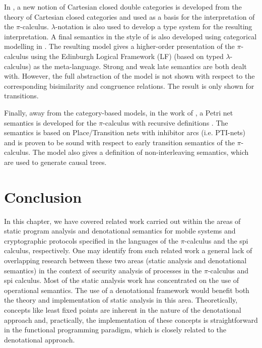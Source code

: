 \documentclass[10pt,a4paper,final,oneside,fleqn]{book}
\begin{document}
In \cite{bruni1}, a new notion of Cartesian closed double categories is developed from the theory of Cartesian closed categories and used as a basis for the interpretation of the $\pi$-calculus.  $\lambda$-notation is also used to develop a type system for the resulting interpretation.  A final semantics in the style of \cite{aczel1} is also developed using categorical modelling in \cite{honsell1}.  The resulting model gives a higher-order presentation of the $\pi$-calculus using the Edinburgh Logical Framework (LF) (based on typed $\lambda$-calculus) as the meta-language.  Strong and weak late semantics are both dealt with.  However, the full abstraction of the model is not shown with respect to the corresponding bisimilarity and congruence relations. The result is only shown for transitions.

Finally, away from the category-based models, in the work of \cite{busi1}, a Petri net semantics is developed for the $\pi$-calculus with recursive definitions \cite{sangiorgi1}.  The semantics is based on Place/Transition nets with inhibitor arcs (i.e. PTI-nets) and is proven to be sound with respect to early transition semantics of the $\pi$-calculus.  The model also gives a definition of non-interleaving semantics, which are used to generate causal trees.
\section{Conclusion}
In this chapter, we have covered related work carried out within the areas of static program analysis and denotational semantics for mobile systems and cryptographic protocols specified in the languages of the $\pi$-calculus and the spi calculus, respectively.  One may identify from such related work a general lack of overlapping research between these two areas (static analysis and denotational semantics) in the context of security analysis of processes in the $\pi$-calculus and spi calculus. Most of the static analysis work has concentrated on the use of operational semantics.  The use of a denotational framework would benefit both the theory and implementation of static analysis in this area. Theoretically, concepts like least fixed points are inherent in the nature of the denotational approach and, practically, the implementation of these concepts is straightforward in the functional programming paradigm, which is closely related to the denotational approach.
\end{document}
